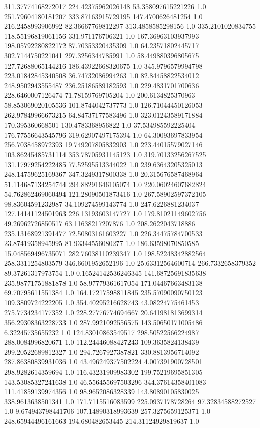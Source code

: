 311.37774168272017	224.42375962026148	53.358097615221226	1.0
251.79604180181207	333.87163915729195	147.4700626481254	1.0
216.2458993906992	82.36667769812297	313.4858585298156	1.0
335.2101020834755	118.55196819061156	331.971176706321	1.0
167.36963103937993	198.05792280822172	87.70353320435309	1.0
64.23571802445717	302.7144750221041	297.3256344785991	1.0
58.449880396805675	127.72688065144216	186.43922668320675	1.0
345.9796579994798	223.01842845340508	36.74732086994263	1.0
82.84458822534012	248.9502943555487	236.25186589182593	1.0
229.4831701700636	228.6460007126474	71.78159769705204	1.0
200.6134825370963	58.853069020105536	101.8744042737773	1.0
126.71044450126053	262.97849966673215	64.84737177583496	1.0
323.01243589171884	170.395360668501	130.4783368956822	1.0
37.534985592225404	176.77556643545796	319.62907497175394	1.0
64.30093697833954	256.7038458972393	19.749207805832903	1.0
223.44015579027146	103.86245485731114	353.78705931145123	1.0
319.70133256267525	131.17979254222485	77.52595513344022	1.0
239.63643205325013	248.14759625169367	347.3249317800338	1.0
20.315676587468964	51.114687134254744	294.88291646105074	1.0
220.06024607682824	54.762862469060494	121.28090501873416	1.0
267.58902597372105	98.83604591232987	34.109274599143774	1.0
247.6226881234037	127.14141124501963	226.13193603147727	1.0
179.81021149602756	49.26962726850517	63.11638217207876	1.0
208.2622043718886	235.13168921391477	72.50803161603227	1.0
226.34475784700533	23.87419358945995	81.93344556080277	1.0
186.63598070850585	15.048569496735071	282.76038110239347	1.0
198.52248342882564	258.3311254803579	346.6601952652196	1.0
25.63312564600714	266.7332658379352	89.37261317973754	1.0
0.16524142536246345	141.68725691835638	235.98771751881878	1.0
58.97779361617054	171.04467663483138	69.70795611551384	1.0
164.17217598811845	235.57090090750123	109.3809724222205	1.0
354.40295216628743	43.08224775461453	275.7734234177352	1.0
228.27776774694667	20.641981813699314	356.29308363228733	1.0
287.9921092556575	143.50650171005486	6.32245735655232	1.0
124.83010863549517	298.50522566224987	288.0084996820671	1.0
112.24446088427243	109.3635824138439	299.20522689812327	1.0
294.7267927387821	330.8813956714092	287.86380839931036	1.0
43.496249377502224	4.007391900728501	298.9282614359694	1.0
116.43231909983302	199.75219695851305	143.53085327241638	1.0
46.556455697503296	344.37614358401083	111.41859139974356	1.0
98.9652086328339	143.80890105830025	338.9613638501341	1.0
171.7115516083599	225.0937178728264	97.32834588272527	1.0
9.674943798441706	107.14890318993639	257.3275659125371	1.0
248.65944496161663	194.680482653445	214.31124929819637	1.0
